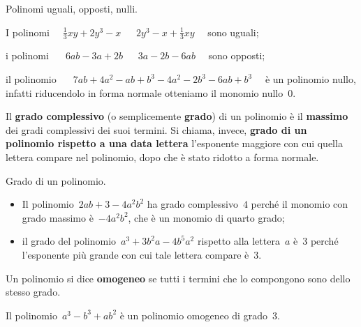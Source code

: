 \begin{esempio}{}{}
Polinomi uguali, opposti, nulli.
\begin{enumeratea}
\item I polinomi
\(\quad \frac{1}{3}xy+2y^3-x\) \(\quad~2y^3-x+\frac{1}{3}xy \quad\) 
sono uguali;
\item i polinomi~\(\quad~6ab-3a+2b\) \(\quad~3a-2b-6ab \quad\) 
sono opposti;
\item il polinomio~\(\quad~7ab+4a^2-ab+b^3-4a^2-2b^3-6ab+b^3 \quad\) è un 
polinomio nullo, infatti riducendolo in forma normale otteniamo il 
monomio nullo~\(0\).
\end{enumeratea}
\end{esempio}

\begin{definizione}{}{}
Il \textbf{grado complessivo} (o semplicemente
\textbf{grado}) di un
polinomio è il \textbf{massimo} dei gradi complessivi dei suoi termini.
Si chiama, invece, \textbf{grado di un polinomio rispetto a una
data lettera} l'esponente maggiore con cui quella lettera compare nel 
polinomio, dopo che è stato ridotto a forma normale.
\end{definizione}

\begin{esempio}{}{} Grado di un polinomio.
\begin{itemize} [nosep]
\item Il polinomio~\(2ab+3-4a^2b^2\) ha grado complessivo~\(4\) perché il 
monomio con grado massimo è~\(-4a^2b^2 \), che è un monomio di quarto 
grado;
\item il grado del polinomio~\(a^3+3b^2a-4b^5a^2\) rispetto alla 
lettera~\(a\) è~\(3\) perché l'esponente più grande con cui tale lettera 
compare è~\(3\).
\end{itemize}
\end{esempio}


\begin{definizione}{}{}
Un polinomio si dice \textbf{omogeneo} se tutti i termini che lo compongono sono dello stesso grado.
\end{definizione}

\begin{esempio}{}{}
Il polinomio~\(a^3-b^3+ab^2\) è un polinomio omogeneo di grado~\(3\).
\end{esempio}


